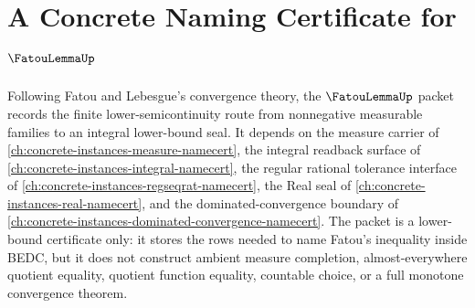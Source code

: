 \chapter{A Concrete Naming Certificate for $\FatouLemmaUp$}
\label{ch:concrete-instances-fatou-lemma-namecert}

Following Fatou and Lebesgue's convergence theory, the $\FatouLemmaUp$ packet records the finite lower-semicontinuity route from nonnegative measurable families to an integral lower-bound seal. It depends on the measure carrier of \autoref{ch:concrete-instances-measure-namecert}, the integral readback surface of \autoref{ch:concrete-instances-integral-namecert}, the regular rational tolerance interface of \autoref{ch:concrete-instances-regseqrat-namecert}, the Real seal of \autoref{ch:concrete-instances-real-namecert}, and the dominated-convergence boundary of \autoref{ch:concrete-instances-dominated-convergence-namecert}. The packet is a lower-bound certificate only: it stores the rows needed to name Fatou's inequality inside BEDC, but it does not construct ambient measure completion, almost-everywhere quotient equality, quotient function equality, countable choice, or a full monotone convergence theorem.

